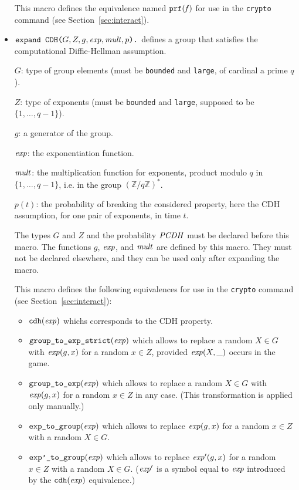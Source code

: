 \documentclass{article}
\begin{document}
\begin{itemize}
   This macro defines the equivalence named $\texttt{prf}(\mathit{f})$
   for use in the \texttt{crypto} command 
   (see Section~\ref{sec:interact}).

\item $\texttt{expand\ CDH(}G, Z, g, \mathit{exp}, \mathit{mult},
  p\texttt{).}$ defines a group that satisfies the computational
  Diffie-Hellman assumption.

   $G$: type of group elements (must be \texttt{bounded} and \texttt{large}, of cardinal a prime $q$).

   $Z$: type of exponents (must be \texttt{bounded} and \texttt{large}, 
   supposed to be $\{1, \ldots, q-1\}$).

   $g$: a generator of the group.

   $\mathit{exp}$: the exponentiation function.

   $\mathit{mult}$: the multiplication function for exponents, product modulo $q$ in
   $\{1, \ldots, q-1\}$, i.e. in the group $(\mathbb{Z}/q\mathbb{Z})^*$.

   $p(t)$: the probability of breaking the considered property, here
   the CDH assumption, for one pair of exponents, in time $t$.

   The types $G$ and $Z$ and the probability $\mathit{PCDH}$ must be
   declared before this macro.  The functions $g$, $\mathit{exp}$, and
   $\mathit{mult}$ are defined by this macro. They must not be declared
   elsewhere, and they can be used only after expanding the macro.

   This macro defines the following equivalences for use in the
   \texttt{crypto} command (see Section~\ref{sec:interact}):
\begin{itemize}
\item $\texttt{cdh}(\mathit{exp})$ whichs corresponds to the CDH property.
\item $\texttt{group\_to\_exp\_strict}(\mathit{exp})$ which allows to replace
a random $X \in G$ with $\mathit{exp}(g,x)$ for a random $x \in Z$, provided
$\mathit{exp}(X,\_)$ occurs in the game.
\item $\texttt{group\_to\_exp}(\mathit{exp})$ which allows to replace
a random $X \in G$ with $\mathit{exp}(g,x)$ for a random $x \in Z$ in any case.
(This transformation is applied only manually.)
\item $\texttt{exp\_to\_group}(\mathit{exp})$ which allows to replace
$\mathit{exp}(g,x)$ for a random $x \in Z$ with a random $X \in G$.
\item $\texttt{exp'\_to\_group}(\mathit{exp})$ which allows to replace
$\mathit{exp'}(g,x)$ for a random $x \in Z$ with a random $X \in G$.
($\mathit{exp'}$ is a symbol equal to $\mathit{exp}$ introduced by the
$\texttt{cdh}(\mathit{exp})$ equivalence.)
\end{itemize}


\end{itemize}
\end{document}
